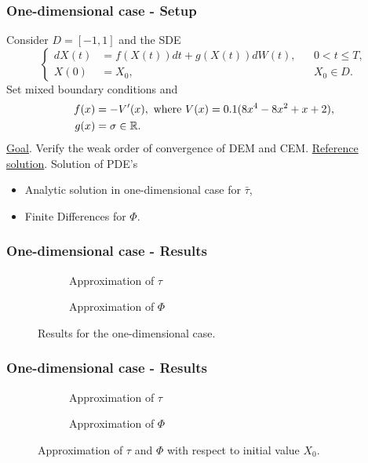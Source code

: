 \begin{frame}
\frametitle{One-dimensional case - Setup}
Consider $D=[-1,1]$ and the SDE
\begin{equation*}
\left \{
\begin{aligned}
	dX(t) &= f(X(t)) dt + g(X(t))dW(t), && 0 < t \leq T, \\
	X(0)  &= X_0, && X_0 \in D.
\end{aligned} \right .
\end{equation*}
Set mixed boundary conditions and
\begin{equation*}
\begin{split}
	f(x) &= -V'(x), \text{ where } V(x) = 0.1(8x^4 - 8x^2 + x + 2), \\
	g(x) &= \sigma \in \mathbb{R}.
\end{split}
\end{equation*}
\underline{Goal}. Verify the weak order of convergence of DEM and CEM.
\underline{Reference solution}. Solution of PDE's
\begin{itemize}
	\item Analytic solution in one-dimensional case for $\bar \tau$,
	\item Finite Differences for $\Phi$.
\end{itemize}
\end{frame}

\begin{frame}
\frametitle{One-dimensional case - Results}
\begin{figure}[t]
    \centering
    \begin{subfigure}{0.49\linewidth}
        \centering
        \resizebox{1\linewidth}{!}{ }  
        \caption{Approximation of $\tau$}
        \label{fig:KillOneDPhi}
    \end{subfigure}
    \begin{subfigure}{0.49\linewidth}
        \centering
        \resizebox{1\linewidth}{!}{ }  
        \caption{Approximation of $\Phi$}
        \label{fig:ReflectOneDPhi}
    \end{subfigure}    
    \caption{Results for the one-dimensional case.}
\end{figure}
\end{frame}

\begin{frame}
\frametitle{One-dimensional case - Results}
\begin{figure}[t]
    \centering
    \begin{subfigure}{0.49\linewidth}
        \centering
        \resizebox{1\linewidth}{!}{ }  
        \caption{Approximation of $\tau$}
        \label{fig:KillOneDPhi}
    \end{subfigure}
    \begin{subfigure}{0.49\linewidth}
        \centering
        \resizebox{1\linewidth}{!}{ }  
        \caption{Approximation of $\Phi$}
        \label{fig:ReflectOneDPhi}
    \end{subfigure}    
    \caption{Approximation of $\tau$ and $\Phi$ with respect to initial value $X_0$.}
\end{figure}
\end{frame}
